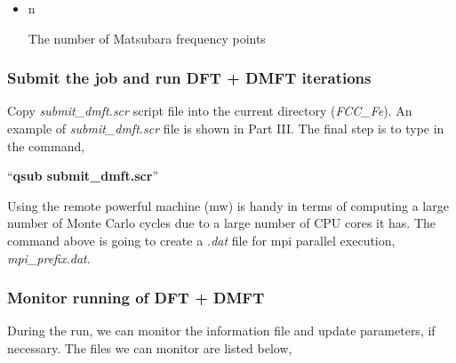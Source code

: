 \documentclass[12 pt]{article}
\begin{document}
\begin{itemize}[leftmargin=0.2in]
\begin{itemize}
\begin{itemize}
	      \item n

  The number of Matsubara frequency points

	      \end{itemize}

	  \end{itemize}

	\end{itemize}

	\subsubsection{Submit the job and run DFT + DMFT iterations}

  Copy \emph{submit\_dmft.scr} script file into the current directory (\emph{FCC\_Fe}). An example of 
\emph{submit\_dmft.scr} file is shown in Part III. The final step is to type in the command,

  ``\textbf{qsub submit\_dmft.scr}''

  Using the remote powerful machine (mw) is handy in terms of computing a large number of Monte Carlo cycles due to a 
large number of CPU cores it has. The command above is going to create a \emph{.dat} file for mpi parallel execution, 
\emph{mpi\_prefix.dat}. 

  \cleardoublepage

	\subsubsection{Monitor running of DFT + DMFT}

  During the run, we can monitor the information file and update parameters, if necessary. The files we can monitor
 are listed below,
\end{document}
